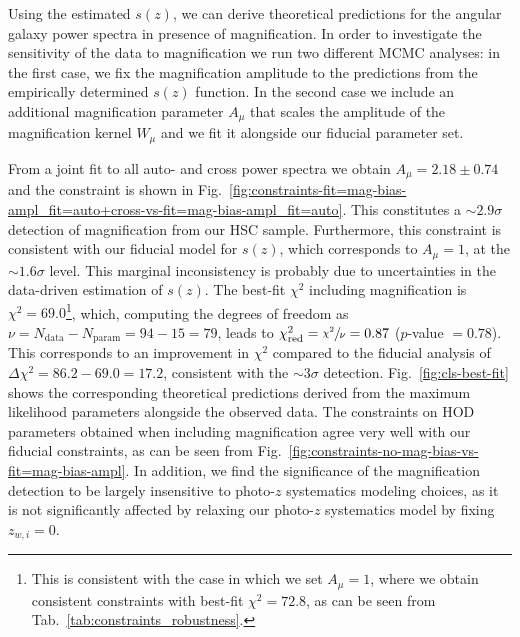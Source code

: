 \documentclass[a4paper,11pt]{article}
\begin{document}
    Using the estimated $s(z)$, we can derive theoretical predictions for the angular galaxy power spectra in presence of magnification. In order to investigate the sensitivity of the data to magnification we run two different MCMC analyses: in the first case, we fix the magnification amplitude to the predictions from the empirically determined $s(z)$ function. In the second case we include an additional magnification parameter $A_{\mu}$ that scales the amplitude of the magnification kernel $W_{\mu}$ and we fit it alongside our fiducial parameter set.

    From a joint fit to all auto- and cross power spectra we obtain $A_{\mu} = 2.18 \pm 0.74$ and the constraint is shown in Fig.~\ref{fig:constraints-fit=mag-bias-ampl_fit=auto+cross-vs-fit=mag-bias-ampl_fit=auto}. This constitutes a $\sim 2.9 \sigma$ detection of magnification from our HSC sample. Furthermore, this constraint is consistent with our fiducial model for $s(z)$, which corresponds to $A_{\mu} = 1$, at the $\sim 1.6 \sigma$ level. This marginal inconsistency is probably due to uncertainties in the data-driven estimation of $s(z)$. The best-fit $\chi^{2}$ including magnification is $\chi^{2} = 69.0$\footnote{This is consistent with the case in which we set $A_{\mu}=1$, where we obtain consistent constraints with best-fit $\chi^{2} = 72.8$, as can be seen from Tab.~\ref{tab:constraints_robustness}.}, which, computing the degrees of freedom as $\nu = N_{\mathrm{data}} - N_{\mathrm{param}} = 94 - 15 = 79$, leads to $\chi^{2}_{\mathrm{red}} = \sfrac{\chi^{2}}{\nu} = 0.87$ ($p$-value $= 0.78$). This corresponds to an improvement in $\chi^{2}$ compared to the fiducial analysis of $\Delta \chi^{2} = 86.2 - 69.0 = 17.2$, consistent with the $\sim 3 \sigma$ detection. Fig.~\ref{fig:cls-best-fit} shows the corresponding theoretical predictions derived from the maximum likelihood parameters alongside the observed data. The constraints on HOD parameters obtained when including magnification agree very well with our fiducial constraints, as can be seen from Fig.~\ref{fig:constraints-no-mag-bias-vs-fit=mag-bias-ampl}. In addition, we find the significance of the magnification detection to be largely insensitive to photo-$z$ systematics modeling choices, as it is not significantly affected by relaxing our photo-$z$ systematics model by fixing $z_{w, i} = 0$. 
\end{document}
